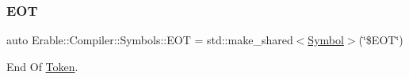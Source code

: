 \mbox{\label{namespace_erable_1_1_compiler_1_1_symbols_a3b63037427c62704cfddfbb43310e962}} 
\subsubsection{\texorpdfstring{EOT}{EOT}}
{\footnotesize\ttfamily auto Erable\+::\+Compiler\+::\+Symbols\+::\+E\+OT = std\+::make\+\_\+shared$<$\mbox{\hyperlink{class_erable_1_1_compiler_1_1_symbols_1_1_symbol}{Symbol}}$>$(\char`\"{}\$E\+OT\char`\"{})\hspace{0.3cm}{\ttfamily [inline]}}



End Of \mbox{\hyperlink{struct_token}{Token}}. 

